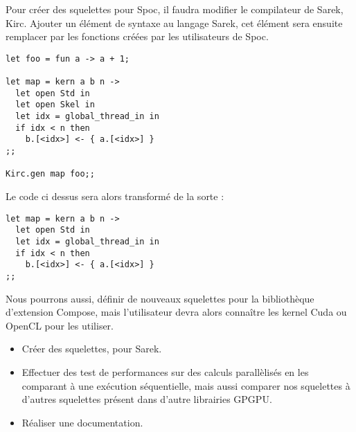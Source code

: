\documentclass{report}
\begin{document}
Pour créer des squelettes pour Spoc, il faudra modifier le compilateur de Sarek, Kirc. Ajouter un élément de syntaxe au langage Sarek, cet élément sera ensuite remplacer par les fonctions créées par les utilisateurs de Spoc. 

\begin{lstlisting}
let foo = fun a -> a + 1;

let map = kern a b n ->
  let open Std in
  let open Skel in
  let idx = global_thread_in in
  if idx < n then
    b.[<idx>] <- { a.[<idx>] }
;;

Kirc.gen map foo;; 
\end{lstlisting}

Le code ci dessus sera alors transformé de la sorte :

\begin{lstlisting}
let map = kern a b n ->
  let open Std in
  let idx = global_thread_in in
  if idx < n then
    b.[<idx>] <- { a.[<idx>] }
;;
\end{lstlisting}

Nous pourrons aussi, définir de nouveaux squelettes pour la bibliothèque d’extension Compose, mais l’utilisateur devra alors connaître les kernel Cuda ou OpenCL pour les utiliser. 

\begin{itemize}
\item Créer des squelettes, pour Sarek.
\item Effectuer des test de performances sur des calculs parallèlisés en les comparant à une exécution séquentielle, mais aussi comparer nos squelettes à d’autres squelettes présent dans d’autre librairies GPGPU.
\item Réaliser une documentation.
\end{itemize}

%
%
\end{document}
